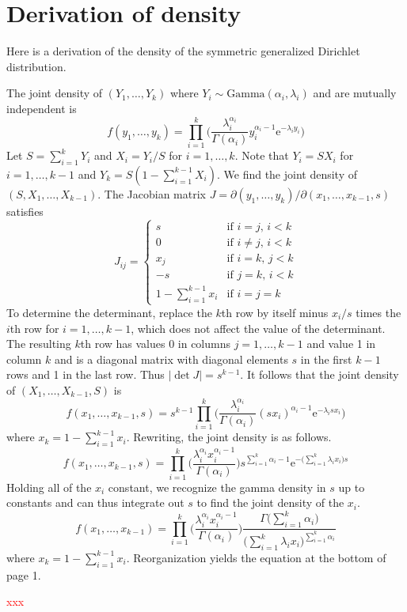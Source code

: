 \documentclass[ba]{imsart}
\numberwithin{equation}{section}
\theoremstyle{plain}
\newcommand{\falta}[1]{\textcolor{red}{#1}}
\begin{document}
\appendix
\section{Derivation of density}

Here is a derivation of the density of the symmetric generalized Dirichlet distribution.

The joint density of $(Y_1,\ldots,Y_k)$ where $Y_i \sim \text{Gamma}(\alpha_i,\lambda_i)$ and are mutually independent is
$$
f(y_1,\ldots,y_k) = \prod_{i=1}^k \Bigg( \frac{ \lambda_i^{\alpha_i}}{\Gamma(\alpha_i)} y_i^{\alpha_i-1} \mathrm{e}^{-\lambda_i y_i} \Bigg)
$$
Let $S = \sum_{i=1}^k Y_i$ and $X_i = Y_i / S$ for $i=1,\ldots,k$.
Note that $Y_i = SX_i$ for $i=1,\ldots,k-1$ and $Y_k = S(1 - \sum_{i=1}^{k-1} X_i)$.
We find the joint density of $(S,X_1,\ldots,X_{k-1})$.
The Jacobian matrix $J = \partial(y_1,\ldots,y_k)/\partial(x_1,\ldots,x_{k-1},s)$
satisfies
$$
J_{ij} = \left\{
\begin{array}{ll}
s & \text{if $i=j$, $i<k$} \\
0 & \text{if $i \neq j$, $i<k$} \\
x_j & \text{if $i=k$, $j<k$} \\
-s & \text{if $j=k$, $i<k$} \\
1 - \sum_{i=1}^{k-1} x_i & \text{if $i=j=k$}
\end{array}
\right.
$$
To determine the determinant,
replace the $k$th row by itself minus $x_i/s$ times the $i$th row
for $i=1,\ldots,k-1$,
which does not affect the value of the determinant.
The resulting $k$th row has values 0 in columns $j=1,\ldots,k-1$ and value 1
in column $k$ and is a diagonal matrix with diagonal elements $s$ in the first $k-1$ rows and 1 in the last row.
Thus $|\det J| = s^{k-1}$.
It follows that the joint density of $(X_1,\ldots,X_{k-1},S)$ is
$$
f(x_1,\ldots,x_{k-1},s) = s^{k-1} \prod_{i=1}^k \Bigg( \frac{ \lambda_i^{\alpha_i}}{\Gamma(\alpha_i)} (sx_i)^{\alpha_i-1} \mathrm{e}^{-\lambda_i sx_i} \Bigg)
$$
where $x_k = 1 - \sum_{i=1}^{k-1} x_i$.
Rewriting, the joint density is as follows.
$$
f(x_1,\ldots,x_{k-1},s) =  \prod_{i=1}^k \Bigg( \frac{ \lambda_i^{\alpha_i}x_i^{\alpha_i-1}}{\Gamma(\alpha_i)} \Bigg)
s^{\sum_{i=1}^k \alpha_i-1} \mathrm{e}^{-\big(\sum_{i=1}^k \lambda_ix_i\big)s}
$$
Holding all of the $x_i$ constant,
we recognize the gamma density in $s$
up to constants and can thus integrate out $s$ to find the joint density of the $x_i$.
$$
f(x_1,\ldots,x_{k-1}) = \prod_{i=1}^k \Bigg( \frac{ \lambda_i^{\alpha_i}x_i^{\alpha_i-1}}{\Gamma(\alpha_i)} \Bigg) \frac{\Gamma\big(\sum_{i=1}^k \alpha_i\big)}{\big(\sum_{i=1}^k \lambda_i x_i\big)^{\sum_{i=1}^k \alpha_i}}
$$
where $x_k = 1 - \sum_{i=1}^{k-1} x_i$.
Reorganization yields the equation at the bottom of page 1.




\begin{acknowledgement}
\falta{xxx}
\end{acknowledgement}
\end{document}
